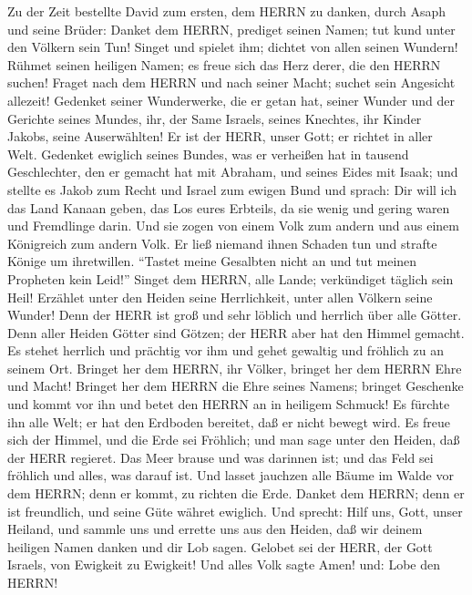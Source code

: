 Zu der Zeit bestellte David zum ersten, dem HERRN zu
danken, durch Asaph und seine Brüder:  Danket dem HERRN,
prediget seinen Namen; tut kund unter den Völkern sein Tun! 
Singet und spielet ihm; dichtet von allen seinen Wundern! 
Rühmet seinen heiligen Namen; es freue sich das Herz derer, die den
HERRN suchen!  Fraget nach dem HERRN und nach seiner Macht;
suchet sein Angesicht allezeit!  Gedenket seiner
Wunderwerke, die er getan hat, seiner Wunder und der Gerichte seines
Mundes,  ihr, der Same Israels, seines Knechtes, ihr Kinder
Jakobs, seine Auserwählten!  Er ist der HERR, unser Gott;
er richtet in aller Welt.  Gedenket ewiglich seines Bundes,
was er verheißen hat in tausend Geschlechter,  den er
gemacht hat mit Abraham, und seines Eides mit Isaak;  und
stellte es Jakob zum Recht und Israel zum ewigen Bund  und
sprach: Dir will ich das Land Kanaan geben, das Los eures Erbteils,
 da sie wenig und gering waren und Fremdlinge darin.
 Und sie zogen von einem Volk zum andern und aus einem
Königreich zum andern Volk.  Er ließ niemand ihnen Schaden
tun und strafte Könige um ihretwillen.  ``Tastet meine
Gesalbten nicht an und tut meinen Propheten kein Leid!'' 
Singet dem HERRN, alle Lande; verkündiget täglich sein Heil!
 Erzählet unter den Heiden seine Herrlichkeit, unter allen
Völkern seine Wunder!  Denn der HERR ist groß und sehr
löblich und herrlich über alle Götter.  Denn aller Heiden
Götter sind Götzen; der HERR aber hat den Himmel gemacht. 
Es stehet herrlich und prächtig vor ihm und gehet gewaltig und fröhlich
zu an seinem Ort.  Bringet her dem HERRN, ihr Völker,
bringet her dem HERRN Ehre und Macht!  Bringet her dem
HERRN die Ehre seines Namens; bringet Geschenke und kommt vor ihn und
betet den HERRN an in heiligem Schmuck!  Es fürchte ihn
alle Welt; er hat den Erdboden bereitet, daß er nicht bewegt wird.
 Es freue sich der Himmel, und die Erde sei Fröhlich; und
man sage unter den Heiden, daß der HERR regieret.  Das Meer
brause und was darinnen ist; und das Feld sei fröhlich und alles, was
darauf ist.  Und lasset jauchzen alle Bäume im Walde vor
dem HERRN; denn er kommt, zu richten die Erde.  Danket dem
HERRN; denn er ist freundlich, und seine Güte währet ewiglich.
 Und sprecht: Hilf uns, Gott, unser Heiland, und sammle uns
und errette uns aus den Heiden, daß wir deinem heiligen Namen danken und
dir Lob sagen.  Gelobet sei der HERR, der Gott Israels, von
Ewigkeit zu Ewigkeit! Und alles Volk sagte Amen! und: Lobe den HERRN!

